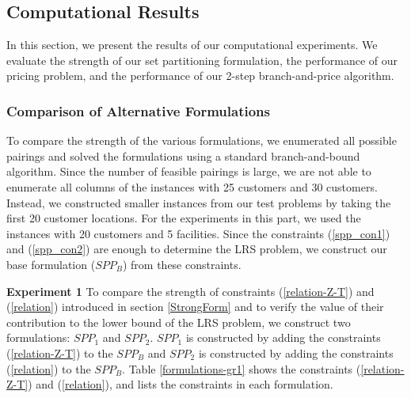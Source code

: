 
\subsection{Computational Results}
In this section, we present the results of our computational experiments. 
We evaluate the strength of our set partitioning formulation, the performance of 
our pricing problem, and the performance of our 2-step branch-and-price algorithm. 

\subsubsection{Comparison of Alternative Formulations}
To compare the strength of the various formulations, we enumerated all possible 
pairings and solved the formulations using a standard branch-and-bound algorithm.
Since the number of feasible pairings is large, we are not able to enumerate
all columns of the instances with 25 customers and 30 customers. Instead, we constructed 
smaller instances from our test problems by taking the first 20 customer locations.
For the experiments in this part, we used the instances with 20 customers and
5 facilities. Since the constraints (\ref{spp_con1}) and (\ref{spp_con2}) are enough to 
determine the LRS problem, we construct our base formulation ($SPP_B$) from these
constraints. 

{\bf Experiment 1} To compare the strength of constraints (\ref{relation-Z-T}) and 
(\ref{relation}) introduced in section \ref{StrongForm} and to verify the 
value of their contribution to the lower bound of the LRS problem,
we construct two formulations: $SPP_1$ and $SPP_2$. $SPP_1$ is constructed
by adding the constraints (\ref{relation-Z-T}) to the $SPP_B$ and $SPP_2$ 
is constructed by adding the constraints (\ref{relation}) to the $SPP_B$.
Table \ref{formulations-gr1} shows the constraints (\ref{relation-Z-T}) and
(\ref{relation}), and lists the constraints in each formulation. 

